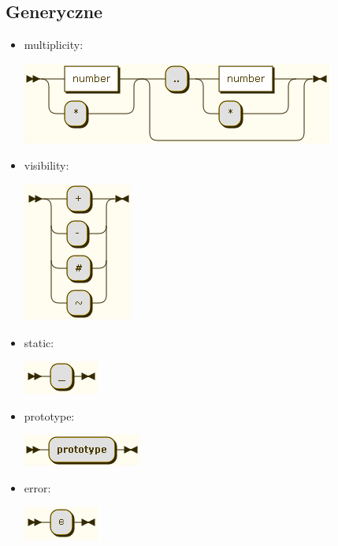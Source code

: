 \subsection{Generyczne}
\begin{itemize}
\item multiplicity:

\includegraphics[scale=0.66]{images/grammar/multiplicity.png}

\item visibility:

\includegraphics[scale=0.66]{images/grammar/visibility.png}

\item static:

\includegraphics[scale=0.66]{images/grammar/static.png}

\item prototype:

\includegraphics[scale=0.66]{images/grammar/prototype.png}

\item error:

\includegraphics[scale=0.66]{images/grammar/error.png}
\end{itemize}
